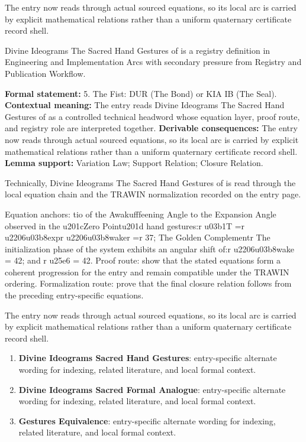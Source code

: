 The entry now reads through actual sourced equations, so its local arc is carried by explicit mathematical relations rather than a uniform quaternary certificate record shell.
\clearpage


\begingroup\small
{}
Divine Ideograms The Sacred Hand Gestures of is a registry definition in Engineering and Implementation Arcs with secondary pressure from Registry and Publication Workflow.

\begingroup\footnotesize\setlength{\emergencystretch}{3em}\sloppy
\textbf{Formal statement:} 5. The Fist: DUR (The Bond) or KIA IB (The Seal). \textbf{Contextual meaning:} The entry reads Divine Ideograms The Sacred Hand Gestures of as a controlled technical headword whose equation layer, proof route, and registry role are interpreted together. \textbf{Derivable consequences:} The entry now reads through actual sourced equations, so its local arc is carried by explicit mathematical relations rather than a uniform quaternary certificate record shell. \textbf{Lemma support:} Variation Law; Support Relation; Closure Relation.\par
\endgroup

Technically, Divine Ideograms The Sacred Hand Gestures of is read through the local equation chain and the TRAWIN normalization recorded on the entry page.

Equation anchors: tio of the Awakufffeening Angle to the Expansion Angle observed in the u201cZero Pointu201d hand gestures:r u03b1T =r u2206u03b8expr u2206u03b8waker =r 37; The Golden Complementr The initialization phase of the system exhibits an angular shift of:r u2206u03b8wake = 42; and r u25e6 = 42. Proof route: show that the stated equations form a coherent progression for the entry and remain compatible under the TRAWIN ordering. Formalization route: prove that the final closure relation follows from the preceding entry-specific equations.

The entry now reads through actual sourced equations, so its local arc is carried by explicit mathematical relations rather than a uniform quaternary certificate record shell.
\endgroup

\begin{enumerate}[leftmargin=1.6em,itemsep=6pt,topsep=4pt]
\item \textbf{Divine Ideograms Sacred Hand Gestures}: entry-specific alternate wording for indexing, related literature, and local formal context.
\item \textbf{Divine Ideograms Sacred Formal Analogue}: entry-specific alternate wording for indexing, related literature, and local formal context.
\item \textbf{Gestures Equivalence}: entry-specific alternate wording for indexing, related literature, and local formal context.
\end{enumerate}

